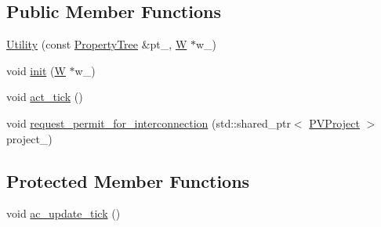 \subsection*{Public Member Functions}
\begin{DoxyCompactItemize}
\item 
\hyperlink{classsolar__core_1_1_utility_aa52a4877b6281d4ffa8f003b831e802c}{Utility} (const \hyperlink{namespacesolar__core_adeda2737d6938c190eb774a5b2495045}{Property\+Tree} \&pt\+\_\+, \hyperlink{classsolar__core_1_1_w}{W} $\ast$w\+\_\+)
\item 
void \hyperlink{classsolar__core_1_1_utility_aec8717094f41f296a2b50310f0faa169}{init} (\hyperlink{classsolar__core_1_1_w}{W} $\ast$w\+\_\+)
\item 
void \hyperlink{classsolar__core_1_1_utility_a71da8601e6cbd65575b8d1b3180484dd}{act\+\_\+tick} ()
\item 
void \hyperlink{classsolar__core_1_1_utility_ac38a138fae309c8f1a0c67f19b621fdb}{request\+\_\+permit\+\_\+for\+\_\+interconnection} (std\+::shared\+\_\+ptr$<$ \hyperlink{classsolar__core_1_1_p_v_project}{P\+V\+Project} $>$ project\+\_\+)
\end{DoxyCompactItemize}
\subsection*{Protected Member Functions}
\begin{DoxyCompactItemize}
\item 
void \hyperlink{classsolar__core_1_1_utility_a64c5f71eb62d4ee87fcacb77624b8c09}{ac\+\_\+update\+\_\+tick} ()
\end{DoxyCompactItemize}

